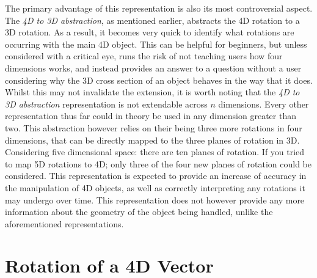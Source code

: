 \documentclass{l4proj}
\begin{document}
The primary advantage of this representation is also its most controversial aspect. The \textit{4D to 3D abstraction}, as mentioned earlier, abstracts the 4D rotation to a 3D rotation. As a result, it becomes very quick to identify what rotations are occurring with the main 4D object. This can be helpful for beginners, but unless considered with a critical eye, runs the risk of not teaching users how four dimensions works, and instead provides an answer to a question without a user considering why the 3D cross section of an object behaves in the way that it does.
Whilst this may not invalidate the extension, it is worth noting that the \textit{4D to 3D abstraction} representation is not extendable across \(n\) dimensions. Every other representation thus far could in theory be used in any dimension greater than two. This abstraction however relies on their being three more rotations in four dimensions, that can be directly mapped to the three planes of rotation in 3D. Considering five dimensional space: there are ten planes of rotation. If you tried to map 5D rotations to 4D; only three of the four new planes of rotation could be considered.
This representation is expected to provide an increase of accuracy in the manipulation of 4D objects, as well as correctly interpreting any rotations it may undergo over time. This representation does not however provide any more information about the geometry of the object being handled, unlike the aforementioned representations.

\section{Rotation of a 4D Vector}
\end{document}
